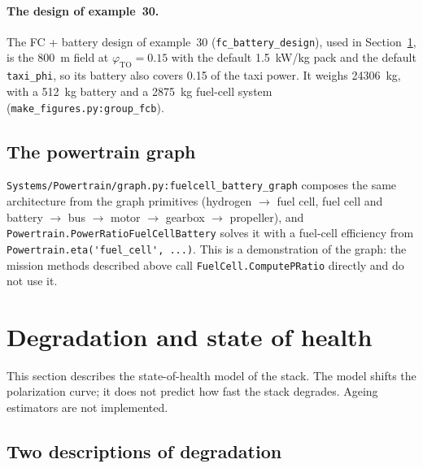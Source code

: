 \documentclass[a4paper,11pt]{article}
\newcommand{\code}[1]{\nolinkurl{#1}}
\newcommand{\fn}[1]{\nolinkurl{#1}}
\begin{document}
\paragraph{The design of example~30.} The FC + battery design of example~30
(\fn{fc_battery_design}), used in Section~\ref{sec:degradation}, is the \SI{800}{m} field at
$\varphi_\mathrm{TO}=0.15$ with the default \SI{1.5}{kW/kg} pack and the default
\code{taxi_phi}, so its battery also covers 0.15 of the taxi power. It weighs \SI{24306}{kg},
with a \SI{512}{kg} battery and a \SI{2875}{kg} fuel-cell system
(\fn{make_figures.py:group_fcb}).

\subsection{The powertrain graph}

\fn{Systems/Powertrain/graph.py:fuelcell_battery_graph} composes the same architecture from the
graph primitives (hydrogen $\to$ fuel cell, fuel cell and battery $\to$ bus $\to$ motor $\to$
gearbox $\to$ propeller), and \fn{Powertrain.PowerRatioFuelCellBattery} solves it with a
fuel-cell efficiency from \fn{Powertrain.eta('fuel_cell', ...)}. This is a demonstration of
the graph: the mission methods described above call \fn{FuelCell.ComputePRatio} directly and
do not use it.

\section{Degradation and state of health}
\label{sec:degradation}

This section describes the state-of-health model of the stack. The model shifts the
polarization curve; it does not predict how fast the stack degrades. Ageing estimators are not
implemented.

\subsection{Two descriptions of degradation}
\end{document}
